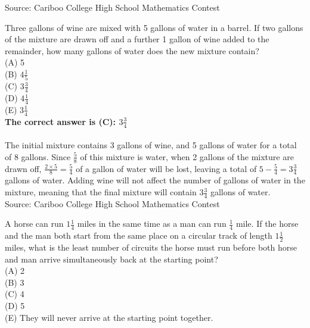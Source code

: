 \documentclass{article}
\begin{document}
\scriptsize
Source: Cariboo College High School Mathematics Contest

\normalsize
Three gallons of wine are mixed with 5 gallons of water in a barrel.  If two gallons of the mixture are drawn off and a further 1 gallon of wine added to the remainder, how many gallons of water does the new mixture contain?\\
(A) 5\\[1 ex]
(B) $4\frac{1}{5}$\\[1 ex]
(C) $3\frac{3}{4}$\\[1 ex]
(D) $4\frac{1}{4}$\\[1 ex]
(E) $3\frac{1}{4}$\\


\textbf{The correct answer is (C): $3\frac{3}{4}$\\[1 ex]}\\[1 ex]
The initial mixture contains 3 gallons of wine, and 5 gallons of water for a total of 8 gallons.  Since $\frac{5}{8}$ of this mixture is water, when 2 gallons of the mixture are drawn off, $\frac{2\times5}{8}=\frac{5}{4}$ of a gallon of water will be lost, leaving a total of $5-\frac{5}{4}=3\frac{3}{4}$ gallons of water.  Adding wine will not affect the number of gallons of water in the mixture, meaning that the final mixture will contain $3\frac{3}{4}$ gallons of water.
\\[5 ex]

\scriptsize
Source: Cariboo College High School Mathematics Contest

\normalsize
A horse can run $1\frac{1}{4}$ miles in the same time as a man can run $\frac{1}{4}$ mile. If the horse and the man both start from the same place on a circular track of length $1\frac{1}{2}$ miles, what is the least number of circuits the horse must run before both horse and man arrive simultaneously back at the starting point?\\
(A) 2\\
(B) 3\\
(C) 4\\
(D) 5\\
(E) They will never arrive at the starting point together.\\
\end{document}
